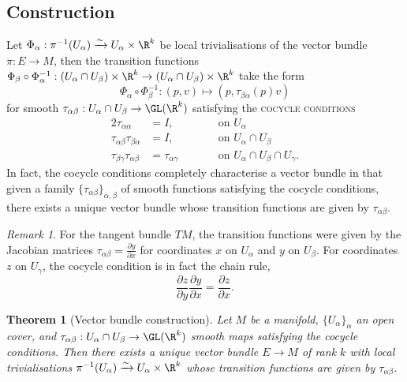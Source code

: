 \documentclass[reqno]{amsart}
\newtheorem{theorem}{Theorem}
\theoremstyle{definition}
\theoremstyle{remark}
\newtheorem*{remark}{Remark}
\renewcommand{\emph}{\textsc}
\begin{document}
\subsection{Construction}

Let $\Phi_\alpha : \pi^{-1} (U_\alpha) \xrightarrow{\sim} U_\alpha \times \R^k$ be local trivialisations of the vector bundle $\pi : E \to M$, then the transition functions $\Phi_\beta \circ \Phi^{-1}_\alpha : (U_\alpha \cap U_\beta) \times \R^k \to (U_\alpha \cap U_\beta) \times \R^k$ take the form 
	\[ \Phi_\alpha \circ \Phi^{-1}_\beta : (p, v) \mapsto (p, \tau_{\beta\alpha} (p) v) \]
for smooth $\tau_{\alpha \beta} : U_\alpha \cap U_\beta \to \GL(\R^k)$ satisfying the \emph{cocycle conditions}
	\begin{alignat*}{2}
		\tau_{\alpha \alpha}
			&= I, && \qquad \text{on $U_\alpha$}\\
		\tau_{\alpha \beta} \tau_{\beta \alpha}
			&= I, && \qquad \text{on $U_\alpha \cap U_\beta$}\\
		\tau_{\beta \gamma} \tau_{\alpha \beta} 
			&= \tau_{\alpha \gamma} && \qquad \text{on $U_\alpha \cap U_\beta \cap U_\gamma$}.
	\end{alignat*}
In fact, the cocycle conditions completely characterise a vector bundle in that given a family $\{ \tau_{\alpha \beta} \}_{\alpha, \beta}$ of smooth functions satisfying the cocycle conditions, there exists a unique vector bundle whose transition functions are given by $\tau_{\alpha \beta}$. 

\begin{remark}
	For the tangent bundle $TM$, the transition functions were given by the Jacobian matrices $\tau_{\alpha \beta} = \tfrac{\partial y}{\partial x}$ for coordinates $x$ on $U_\alpha$ and $y$ on $U_\beta$. For coordinates $z$ on $U_\gamma$, the cocycle condition is in fact the chain rule,
		\[ \frac{\partial z}{\partial y} \frac{\partial y}{\partial x} = \frac{\partial z}{\partial x}.\]
\end{remark}

\begin{theorem}[Vector bundle construction]
	Let $M$ be a manifold, $\{U_\alpha\}_\alpha$ an open cover, and $\tau_{\alpha \beta} : U_\alpha \cap U_\beta \to \GL (\R^k)$ smooth maps satisfying the cocycle conditions. Then there exists a unique vector bundle $E \to M$ of rank $k$ with local trivialisations $\pi^{-1} (U_\alpha) \xrightarrow{\sim} U_\alpha \times \R^k$ whose transition functions are given by $\tau_{\alpha \beta}$.
\end{theorem}
\end{document}
